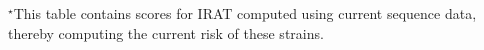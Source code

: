 \ifFIGS

\begin{table}[!ht]\centering
{}\label{irattab_current}

\sffamily\fontsize{7}{8}\selectfont


\flushleft

\fontsize{8}{8}\selectfont
$^\star$This table contains \enet scores for IRAT computed using current sequence data, thereby computing the current risk of these strains.  
\end{table}
\else
{}\label{irattab_current}
\fi

